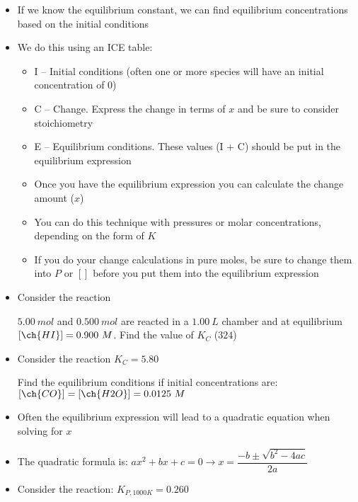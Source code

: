 \documentclass[12pt, openany, letterpaper]{memoir}
\begin{document}
\begin{itemize}
	\item If we know the equilibrium constant, we can find equilibrium concentrations based on the initial conditions
	\item We do this using an ICE table:
	\begin{itemize}
		\item I -- Initial conditions (often one or more species will have an initial concentration of $0$)
		\item C -- Change. Express the change in terms of $x$ and be sure to consider stoichiometry
		\item E -- Equilibrium conditions. These values (I + C) should be put in the equilibrium expression
		\item Once you have the equilibrium expression you can calculate the change amount ($x$)
		\item You can do this technique with pressures or molar concentrations, depending on the form of $K$
		\item If you do your change calculations in pure moles, be sure to change them into $P$ or $[]$ before you put them into the equilibrium expression
	\end{itemize}
	\item Consider the reaction 
	
	$5.00~mol$  and $0.500~mol$  are reacted in a $1.00~L$ chamber and at equilibrium $\left[\ch{HI}\right] = 0.900~M$. Find the value of $K_C$ ($324$)
	\item Consider the reaction  \hspace{1em} $K_C=5.80$
	
	Find the equilibrium conditions if initial concentrations are: $\left[\ch{CO}\right]= \left[\ch{H2O}\right]=0.0125~M$
	\item Often the equilibrium expression will lead to a quadratic equation when solving for $x$
	\item The quadratic formula is: $ax^2 + bx + c = 0 \rightarrow x=\dfrac{-b\pm\sqrt{b^2-4ac}}{2a}$
	\item Consider the reaction:  \hspace{1em} $K_{P,1000K}=0.260$
	

\end{itemize}
\end{document}
